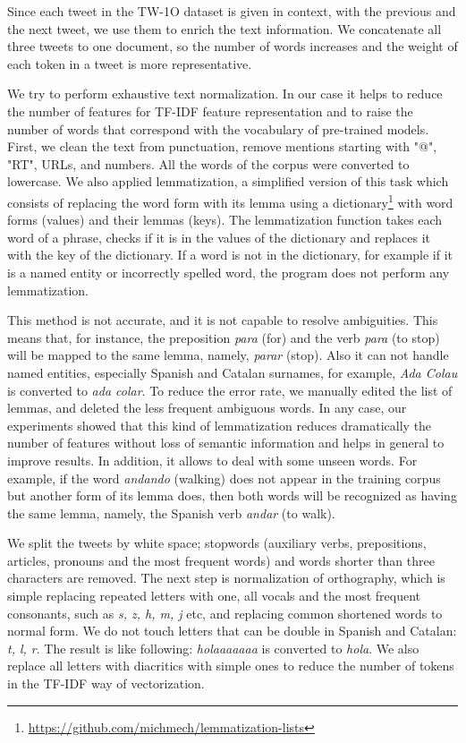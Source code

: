 \documentclass[10pt, a4paper]{article}
\begin{document}
Since each tweet in the TW-1O dataset is given in context, with the previous and the next tweet, we use them to enrich the text information. We concatenate all three tweets to one document, so the number of words increases and the weight of each token in a tweet is more representative.   

We try to perform exhaustive text normalization. In our case it helps to reduce the number of features for TF-IDF feature representation and to raise the number of words that correspond with the vocabulary of pre-trained models. First, we clean the text from punctuation, remove mentions starting with "@", "RT", URLs, and numbers. All the words of the corpus were converted to lowercase. We also applied lemmatization, a simplified version of this task which consists of replacing the word form with its lemma using a dictionary\footnote{\url{https://github.com/michmech/lemmatization-lists}} with word forms (values) and their lemmas (keys). The lemmatization function takes each word of a phrase, checks if it is in the values of the dictionary and replaces it with the key of the dictionary. If a word is not in the dictionary, for example if it is a named entity or incorrectly spelled word, the program does not perform any lemmatization. 

This method is not accurate, and it is not capable to resolve ambiguities. This means that, for instance, the preposition \textit{para} (for) and the verb \textit{para} (to stop) will be mapped to the same lemma, namely, \textit{parar} (stop). Also it can not handle named entities, especially Spanish and Catalan surnames, for example, \textit{Ada Colau} is converted to \textit{ada colar}. To reduce the error rate, we manually edited the list of lemmas, and deleted the less frequent ambiguous words. In any case, our experiments showed that this kind of lemmatization reduces dramatically the number of features without loss of semantic information and helps in general to improve results. In addition, it allows to deal with some unseen words. For example, if the word \textit{andando} (walking) does not appear in the training corpus but another form of its lemma does, then both words will be recognized as having the same lemma, namely, the Spanish verb \textit{andar} (to walk).

We split the tweets by white space; stopwords (auxiliary verbs, prepositions, articles, pronouns and the most frequent words) and words shorter than three characters are removed. The next step is normalization of orthography, which is simple replacing repeated letters with one, all vocals and the most frequent consonants, such as \textit{s, z, h, m, j} etc, and replacing common shortened words to normal form. We do not touch letters that can be double in Spanish and Catalan: \textit{t, l, r}.  The result is like following: \textit{holaaaaaaa} is converted to \textit{hola}. We also replace all letters with diacritics with simple ones to reduce the number of tokens in the TF-IDF way of vectorization. 
\end{document}

